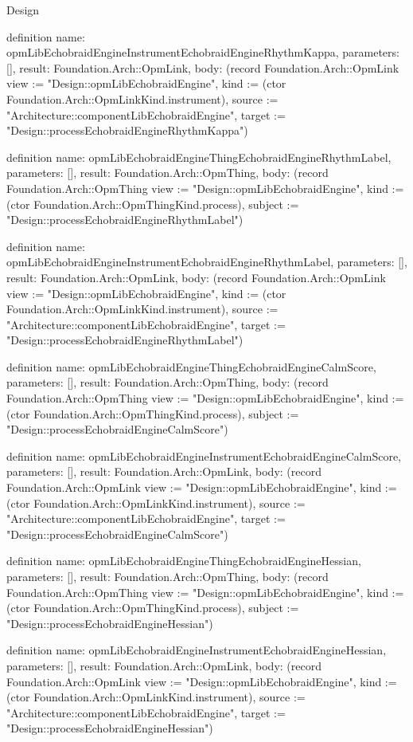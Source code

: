 \begin{lexlean}{Design}
\begin{semanticmodule}
definition{
  name: opmLibEchobraidEngineInstrumentEchobraidEngineRhythmKappa,
  parameters: [],
  result: Foundation.Arch::OpmLink,
  body: (record Foundation.Arch::OpmLink {view := "Design::opmLibEchobraidEngine", kind := (ctor Foundation.Arch::OpmLinkKind.instrument), source := "Architecture::componentLibEchobraidEngine", target := "Design::processEchobraidEngineRhythmKappa"})
}

definition{
  name: opmLibEchobraidEngineThingEchobraidEngineRhythmLabel,
  parameters: [],
  result: Foundation.Arch::OpmThing,
  body: (record Foundation.Arch::OpmThing {view := "Design::opmLibEchobraidEngine", kind := (ctor Foundation.Arch::OpmThingKind.process), subject := "Design::processEchobraidEngineRhythmLabel"})
}

definition{
  name: opmLibEchobraidEngineInstrumentEchobraidEngineRhythmLabel,
  parameters: [],
  result: Foundation.Arch::OpmLink,
  body: (record Foundation.Arch::OpmLink {view := "Design::opmLibEchobraidEngine", kind := (ctor Foundation.Arch::OpmLinkKind.instrument), source := "Architecture::componentLibEchobraidEngine", target := "Design::processEchobraidEngineRhythmLabel"})
}

definition{
  name: opmLibEchobraidEngineThingEchobraidEngineCalmScore,
  parameters: [],
  result: Foundation.Arch::OpmThing,
  body: (record Foundation.Arch::OpmThing {view := "Design::opmLibEchobraidEngine", kind := (ctor Foundation.Arch::OpmThingKind.process), subject := "Design::processEchobraidEngineCalmScore"})
}

definition{
  name: opmLibEchobraidEngineInstrumentEchobraidEngineCalmScore,
  parameters: [],
  result: Foundation.Arch::OpmLink,
  body: (record Foundation.Arch::OpmLink {view := "Design::opmLibEchobraidEngine", kind := (ctor Foundation.Arch::OpmLinkKind.instrument), source := "Architecture::componentLibEchobraidEngine", target := "Design::processEchobraidEngineCalmScore"})
}

definition{
  name: opmLibEchobraidEngineThingEchobraidEngineHessian,
  parameters: [],
  result: Foundation.Arch::OpmThing,
  body: (record Foundation.Arch::OpmThing {view := "Design::opmLibEchobraidEngine", kind := (ctor Foundation.Arch::OpmThingKind.process), subject := "Design::processEchobraidEngineHessian"})
}

definition{
  name: opmLibEchobraidEngineInstrumentEchobraidEngineHessian,
  parameters: [],
  result: Foundation.Arch::OpmLink,
  body: (record Foundation.Arch::OpmLink {view := "Design::opmLibEchobraidEngine", kind := (ctor Foundation.Arch::OpmLinkKind.instrument), source := "Architecture::componentLibEchobraidEngine", target := "Design::processEchobraidEngineHessian"})
}


\end{semanticmodule}
\end{lexlean}
